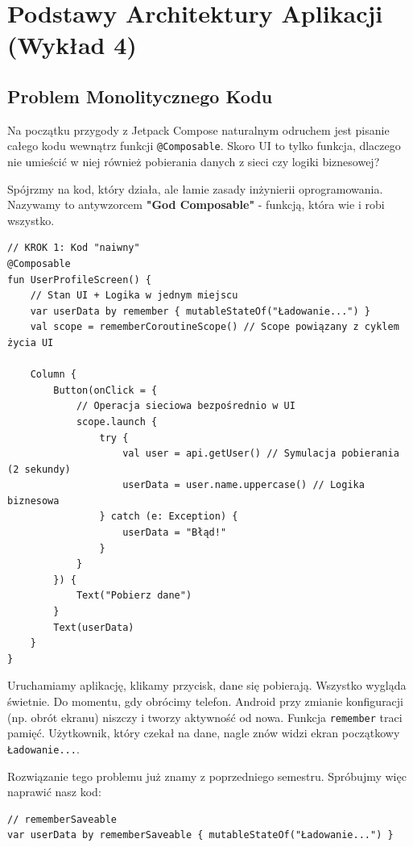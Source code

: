 \chapter{Podstawy Architektury Aplikacji (Wykład 4)}

\section{Problem Monolitycznego Kodu}

Na początku przygody z Jetpack Compose naturalnym odruchem jest pisanie całego kodu wewnątrz funkcji \texttt{@Composable}. Skoro UI to tylko funkcja, dlaczego nie umieścić w niej również pobierania danych z sieci czy logiki biznesowej?

Spójrzmy na kod, który działa, ale łamie zasady inżynierii oprogramowania. Nazywamy to antywzorcem \textbf{"God Composable"} - funkcją, która wie i robi wszystko.

\begin{verbatim}
// KROK 1: Kod "naiwny"
@Composable
fun UserProfileScreen() {
    // Stan UI + Logika w jednym miejscu
    var userData by remember { mutableStateOf("Ładowanie...") }
    val scope = rememberCoroutineScope() // Scope powiązany z cyklem życia UI

    Column {
        Button(onClick = {
            // Operacja sieciowa bezpośrednio w UI
            scope.launch {
                try {
                    val user = api.getUser() // Symulacja pobierania (2 sekundy)
                    userData = user.name.uppercase() // Logika biznesowa
                } catch (e: Exception) {
                    userData = "Błąd!"
                }
            }
        }) {
            Text("Pobierz dane")
        }
        Text(userData)
    }
}
\end{verbatim}

Uruchamiamy aplikację, klikamy przycisk, dane się pobierają. Wszystko wygląda świetnie. Do momentu, gdy obrócimy telefon.
Android przy zmianie konfiguracji (np. obrót ekranu) niszczy i tworzy aktywność od nowa. Funkcja \texttt{remember} traci pamięć. Użytkownik, który czekał na dane, nagle znów widzi ekran początkowy \texttt{Ładowanie...}.

Rozwiązanie tego problemu już znamy z poprzedniego semestru. Spróbujmy więc naprawić nasz kod:

\begin{verbatim}
// rememberSaveable
var userData by rememberSaveable { mutableStateOf("Ładowanie...") }
\end{verbatim}


